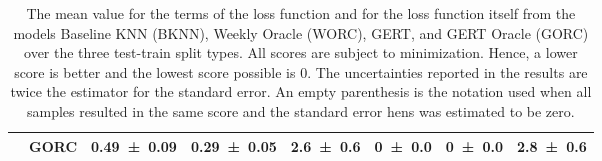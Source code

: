 \begin{table}[ht]
\begin{tabular}{llrrrrrr}
                        & GORC  & \num{0.49\pm 0.09} & \num{0.29\pm 0.05} & \num{2.6 \pm 0.6 } & \num{0   \pm 0.0 } & \num{0   \pm 0.0 } & \num{ 2.8 \pm 0.6}   \\
        \bottomrule
    \end{tabular}
    \caption{The mean value for the terms of the loss function and for the loss function itself from the models Baseline KNN (BKNN), Weekly Oracle (WORC), GERT, and GERT Oracle (GORC) over the three test-train split types. All scores are subject to minimization. Hence, a lower score is better and the lowest score possible is $0$. The uncertainties reported in the results are twice the estimator for the standard error. An empty parenthesis is the notation used when all samples resulted in the same score and the standard error hens was estimated to be zero.}
    \label{tab:results}
\end{table}






